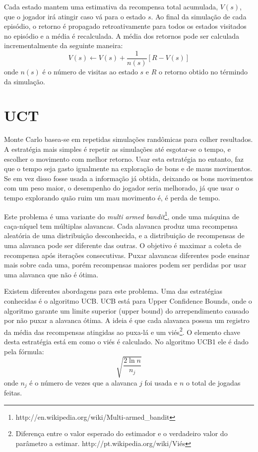Cada estado mantem uma estimativa da recompensa total acumulada, $V(s)$, que o jogador irá atingir caso vá para o estado $s$. Ao final da simulação de cada episódio, o retorno é propagado retroativamente para todos os estados visitados no episódio e a média é recalculada. A média dos retornos pode ser calculada incrementalmente da seguinte maneira:
\begin{equation}
V(s) \leftarrow V(s) + \frac{1}{n(s)}[R - V(s)]
\end{equation}
onde $n(s)$ é o número de visitas ao estado $s$ e $R$ o retorno obtido no términdo da simulação. 

\section{UCT}
Monte Carlo basea-se em repetidas simulações randômicas para colher resultados. A estratégia mais simples é repetir as simulações até esgotar-se o tempo, e escolher o movimento com melhor retorno. Usar esta estratégia no entanto, faz que o tempo seja gasto igualmente na exploração de bons e de maus movimentos. Se em vez disso fosse usada a informação já obtida, deixando os bons movimentos com um peso maior, o desempenho do jogador seria melhorado, já que usar o tempo explorando quão ruim um mau movimento é, é perda de tempo. 

Este problema é uma variante do \textit{multi armed bandit}\footnote{http://en.wikipedia.org/wiki/Multi-armed\_bandit}, onde uma máquina de caça-níquel tem múltiplas alavancas. Cada alavanca produz uma recompensa aleatória de uma distribuição desconhecida, e a distribuição de recompensas de uma alavanca pode ser diferente das outras. O objetivo é maximar a coleta de recompensa após iterações consecutivas. Puxar alavancas diferentes pode ensinar mais sobre cada uma, porém recompensas maiores podem ser perdidas por usar uma alavanca que não é ótima.

Existem diferentes abordagens para este problema. Uma das estratégias conhecidas é o algoritmo UCB\cite{ucb}. UCB está para Upper Confidence Bounds, onde o algoritmo garante um limite superior (upper bound) do arrependimento causado por não puxar a alavanca ótima. A ideia é que cada alavanca possua um registro da média das recompensas atingidas ao puxa-lá e um viés\footnote{Diferença entre o valor esperado do estimador e o verdadeiro valor do parâmetro a estimar. http://pt.wikipedia.org/wiki/Viés}. O elemento chave desta estratégia está em como o viés é calculado. No algoritmo UCB1 ele é dado pela fórmula:
\begin{equation}
\sqrt{\frac{2\ln n}{n_{j}}}
\end{equation}
onde $n_{j}$ é o número de vezes que a alavanca $j$ foi usada e $n$ o total de jogadas feitas. 

